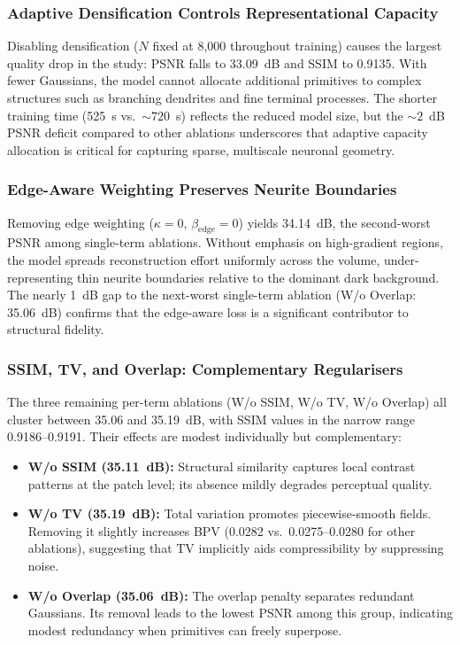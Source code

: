 \documentclass[11pt,a4paper]{article}
\begin{document}
\subsubsection{Adaptive Densification Controls Representational Capacity}

Disabling densification ($N$ fixed at 8{,}000 throughout training) causes the largest quality drop in the study: PSNR falls to 33.09~dB and SSIM to 0.9135.  With fewer Gaussians, the model cannot allocate additional primitives to complex structures such as branching dendrites and fine terminal processes.  The shorter training time (525~s vs.\ ${\sim}720$~s) reflects the reduced model size, but the ${\sim}2$~dB PSNR deficit compared to other ablations underscores that adaptive capacity allocation is critical for capturing sparse, multiscale neuronal geometry.

\subsubsection{Edge-Aware Weighting Preserves Neurite Boundaries}

Removing edge weighting ($\kappa{=}0$, $\beta_{\text{edge}}{=}0$) yields 34.14~dB, the second-worst PSNR among single-term ablations.  Without emphasis on high-gradient regions, the model spreads reconstruction effort uniformly across the volume, under-representing thin neurite boundaries relative to the dominant dark background.  The nearly 1~dB gap to the next-worst single-term ablation (W/o Overlap: 35.06~dB) confirms that the edge-aware loss is a significant contributor to structural fidelity.

\subsubsection{SSIM, TV, and Overlap: Complementary Regularisers}

The three remaining per-term ablations (W/o SSIM, W/o TV, W/o Overlap) all cluster between 35.06 and 35.19~dB, with SSIM values in the narrow range 0.9186--0.9191.  Their effects are modest individually but complementary:
\begin{itemize}
    \item \textbf{W/o SSIM (35.11~dB):} Structural similarity captures local contrast patterns at the patch level; its absence mildly degrades perceptual quality.
    \item \textbf{W/o TV (35.19~dB):} Total variation promotes piecewise-smooth fields.  Removing it slightly increases BPV (0.0282 vs.\ 0.0275--0.0280 for other ablations), suggesting that TV implicitly aids compressibility by suppressing noise.
    \item \textbf{W/o Overlap (35.06~dB):} The overlap penalty separates redundant Gaussians.  Its removal leads to the lowest PSNR among this group, indicating modest redundancy when primitives can freely superpose.
\end{itemize}
\end{document}
